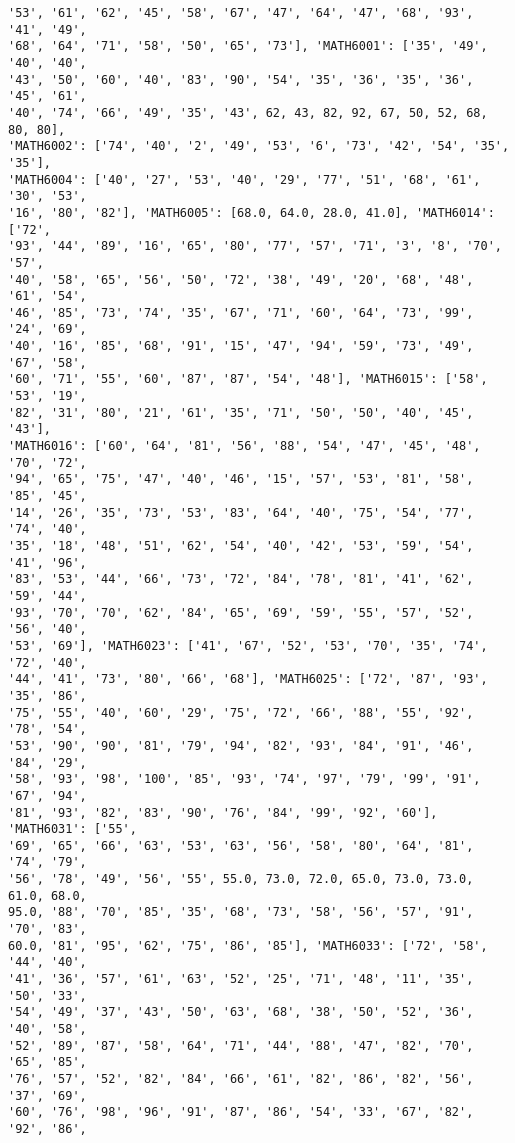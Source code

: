 \documentclass[11pt]{article}
\begin{document}
\begin{Verbatim}[commandchars=\\\{\}]
'53', '61', '62', '45', '58', '67', '47', '64', '47', '68', '93', '41', '49',
'68', '64', '71', '58', '50', '65', '73'], 'MATH6001': ['35', '49', '40', '40',
'43', '50', '60', '40', '83', '90', '54', '35', '36', '35', '36', '45', '61',
'40', '74', '66', '49', '35', '43', 62, 43, 82, 92, 67, 50, 52, 68, 80, 80],
'MATH6002': ['74', '40', '2', '49', '53', '6', '73', '42', '54', '35', '35'],
'MATH6004': ['40', '27', '53', '40', '29', '77', '51', '68', '61', '30', '53',
'16', '80', '82'], 'MATH6005': [68.0, 64.0, 28.0, 41.0], 'MATH6014': ['72',
'93', '44', '89', '16', '65', '80', '77', '57', '71', '3', '8', '70', '57',
'40', '58', '65', '56', '50', '72', '38', '49', '20', '68', '48', '61', '54',
'46', '85', '73', '74', '35', '67', '71', '60', '64', '73', '99', '24', '69',
'40', '16', '85', '68', '91', '15', '47', '94', '59', '73', '49', '67', '58',
'60', '71', '55', '60', '87', '87', '54', '48'], 'MATH6015': ['58', '53', '19',
'82', '31', '80', '21', '61', '35', '71', '50', '50', '40', '45', '43'],
'MATH6016': ['60', '64', '81', '56', '88', '54', '47', '45', '48', '70', '72',
'94', '65', '75', '47', '40', '46', '15', '57', '53', '81', '58', '85', '45',
'14', '26', '35', '73', '53', '83', '64', '40', '75', '54', '77', '74', '40',
'35', '18', '48', '51', '62', '54', '40', '42', '53', '59', '54', '41', '96',
'83', '53', '44', '66', '73', '72', '84', '78', '81', '41', '62', '59', '44',
'93', '70', '70', '62', '84', '65', '69', '59', '55', '57', '52', '56', '40',
'53', '69'], 'MATH6023': ['41', '67', '52', '53', '70', '35', '74', '72', '40',
'44', '41', '73', '80', '66', '68'], 'MATH6025': ['72', '87', '93', '35', '86',
'75', '55', '40', '60', '29', '75', '72', '66', '88', '55', '92', '78', '54',
'53', '90', '90', '81', '79', '94', '82', '93', '84', '91', '46', '84', '29',
'58', '93', '98', '100', '85', '93', '74', '97', '79', '99', '91', '67', '94',
'81', '93', '82', '83', '90', '76', '84', '99', '92', '60'], 'MATH6031': ['55',
'69', '65', '66', '63', '53', '63', '56', '58', '80', '64', '81', '74', '79',
'56', '78', '49', '56', '55', 55.0, 73.0, 72.0, 65.0, 73.0, 73.0, 61.0, 68.0,
95.0, '88', '70', '85', '35', '68', '73', '58', '56', '57', '91', '70', '83',
60.0, '81', '95', '62', '75', '86', '85'], 'MATH6033': ['72', '58', '44', '40',
'41', '36', '57', '61', '63', '52', '25', '71', '48', '11', '35', '50', '33',
'54', '49', '37', '43', '50', '63', '68', '38', '50', '52', '36', '40', '58',
'52', '89', '87', '58', '64', '71', '44', '88', '47', '82', '70', '65', '85',
'76', '57', '52', '82', '84', '66', '61', '82', '86', '82', '56', '37', '69',
'60', '76', '98', '96', '91', '87', '86', '54', '33', '67', '82', '92', '86',

\end{Verbatim}
\end{document}
